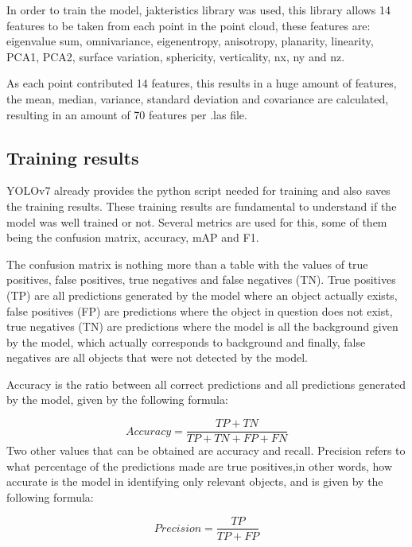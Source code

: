 In order to train the model, jakteristics library was used, this library allows 14 features to be taken from each point in the point cloud, these features are: eigenvalue sum, omnivariance, eigenentropy, anisotropy, planarity, linearity, PCA1, PCA2, surface variation, sphericity, verticality, nx, ny and nz.

As each point contributed 14 features, this results in a huge amount of features, the mean, median, variance, standard deviation and covariance are calculated, resulting in an amount of 70 features per .las file.

\subsection{Training results}

YOLOv7 already provides the python script needed for training and also saves the training results. These training results are fundamental to understand if the model was well trained or not. Several metrics are used for this, some of them being the confusion matrix, accuracy, mAP and F1.

The confusion matrix is nothing more than a table with the values of true positives, false positives, true negatives and false negatives (TN). True positives (TP) are all predictions generated by the model where an object actually exists, false positives (FP) are predictions where the object in question does not exist, true negatives (TN) are predictions where the model is all the background given by the model, which actually corresponds to background and finally, false negatives are all objects that were not detected by the model.

Accuracy is the ratio between all correct predictions and all predictions generated by the model, given by the following formula:

\begin{equation}
     Accuracy = \frac{TP + TN}{TP + TN + FP + FN}
\end{equation}
Two other values that can be obtained are accuracy and recall\cite{https://towardsdatascience.com/on-object-detection-metrics-with-worked-example-216f173ed31e}. Precision refers to what percentage of the predictions made are true positives,in other words, how accurate is the model in identifying only relevant objects, and is given by the following formula:

\begin{equation}
     Precision = \frac{TP }{TP + FP}
\end{equation}

